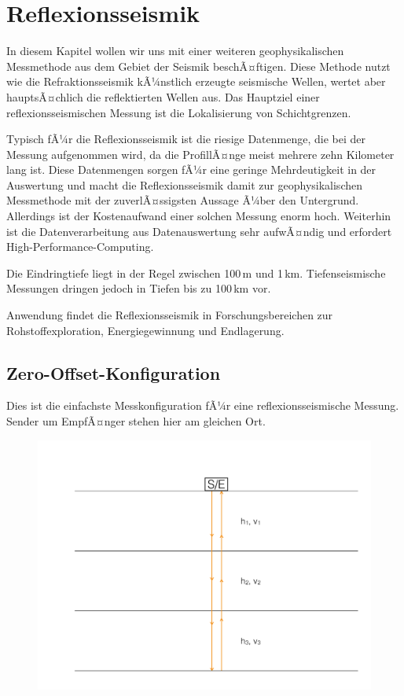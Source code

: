 \chapter{Reflexionsseismik}
In diesem Kapitel wollen wir uns mit einer weiteren geophysikalischen Messmethode aus dem Gebiet der Seismik beschÃ¤ftigen. Diese Methode nutzt wie die Refraktionsseismik kÃ¼nstlich erzeugte seismische Wellen, wertet aber hauptsÃ¤chlich die reflektierten Wellen aus. Das Hauptziel einer reflexionsseismischen Messung ist die Lokalisierung von Schichtgrenzen.

Typisch fÃ¼r die Reflexionsseismik ist die riesige Datenmenge, die bei der Messung aufgenommen wird, da die ProfillÃ¤nge meist mehrere zehn Kilometer lang ist. Diese Datenmengen sorgen fÃ¼r eine geringe Mehrdeutigkeit in der Auswertung und macht die Reflexionsseismik damit zur geophysikalischen Messmethode mit der zuverlÃ¤ssigsten Aussage Ã¼ber den Untergrund. Allerdings ist der Kostenaufwand einer solchen Messung enorm hoch. Weiterhin ist die Datenverarbeitung aus Datenauswertung sehr aufwÃ¤ndig und erfordert High-Performance-Computing. 


Die Eindringtiefe liegt in der Regel zwischen 100\,m und 1\,km. Tiefenseismische Messungen dringen jedoch in Tiefen bis zu 100\,km vor.   

Anwendung findet die Reflexionsseismik in Forschungsbereichen zur Rohstoffexploration, Energiegewinnung und Endlagerung.


\section{Zero-Offset-Konfiguration}
Dies ist die einfachste Messkonfiguration fÃ¼r eine reflexionsseismische Messung. Sender um EmpfÃ¤nger stehen hier am gleichen Ort.

\begin{figure}[H]
	\centering
	\includegraphics[scale = 0.3]{ReflexionsseismikBilder/ZeroOffset}
\end{figure}


